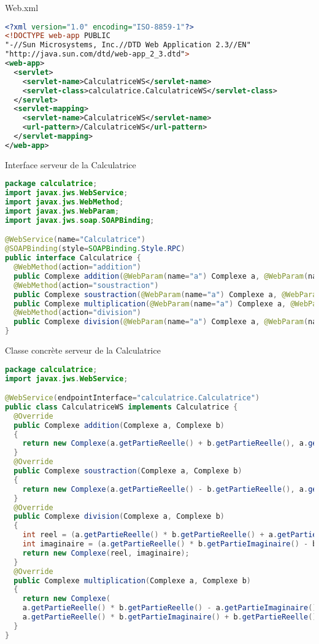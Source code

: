 \documentclass{article}
\begin{document}
Web.xml
\begin{lstlisting}[language=xml]
<?xml version="1.0" encoding="ISO-8859-1"?>
<!DOCTYPE web-app PUBLIC
"-//Sun Microsystems, Inc.//DTD Web Application 2.3//EN"
"http://java.sun.com/dtd/web-app_2_3.dtd">
<web-app>
  <servlet>
    <servlet-name>CalculatriceWS</servlet-name>
    <servlet-class>calculatrice.CalculatriceWS</servlet-class>
  </servlet>
  <servlet-mapping>
    <servlet-name>CalculatriceWS</servlet-name>
    <url-pattern>/CalculatriceWS</url-pattern>
  </servlet-mapping>
</web-app>
\end{lstlisting}

Interface serveur de la Calculatrice
\begin{lstlisting}[language=JAVA]
package calculatrice;
import javax.jws.WebService;
import javax.jws.WebMethod;
import javax.jws.WebParam;
import javax.jws.soap.SOAPBinding;

@WebService(name="Calculatrice")
@SOAPBinding(style=SOAPBinding.Style.RPC)
public interface Calculatrice {
  @WebMethod(action="addition")
  public Complexe addition(@WebParam(name="a") Complexe a, @WebParam(name="b") Complexe b);
  @WebMethod(action="soustraction")
  public Complexe soustraction(@WebParam(name="a") Complexe a, @WebParam(name="b") Complexe b);@WebMethod(action="multiplication")
  public Complexe multiplication(@WebParam(name="a") Complexe a, @WebParam(name="b") Complexe b);
  @WebMethod(action="division")
  public Complexe division(@WebParam(name="a") Complexe a, @WebParam(name="b") Complexe b);
}
\end{lstlisting}

Classe concrète serveur de la Calculatrice
\begin{lstlisting}[language=JAVA]
package calculatrice;
import javax.jws.WebService;

@WebService(endpointInterface="calculatrice.Calculatrice")
public class CalculatriceWS implements Calculatrice {
  @Override
  public Complexe addition(Complexe a, Complexe b)
  {
    return new Complexe(a.getPartieReelle() + b.getPartieReelle(), a.getPartieImaginaire() + b.getPartieImaginaire());
  }
  @Override
  public Complexe soustraction(Complexe a, Complexe b)
  {
    return new Complexe(a.getPartieReelle() - b.getPartieReelle(), a.getPartieImaginaire() - b.getPartieImaginaire());
  }
  @Override
  public Complexe division(Complexe a, Complexe b)
  {
    int reel = (a.getPartieReelle() * b.getPartieReelle() + a.getPartieImaginaire() * b.getPartieImaginaire()) / (b.getPartieReelle() * b.getPartieReelle() +
    int imaginaire = (a.getPartieReelle() * b.getPartieImaginaire() - b.getPartieReelle() * a.getPartieImaginaire()) / (b.getPartieReelle() * b.getPartieReel
    return new Complexe(reel, imaginaire);
  }
  @Override
  public Complexe multiplication(Complexe a, Complexe b)
  {
    return new Complexe(
    a.getPartieReelle() * b.getPartieReelle() - a.getPartieImaginaire() * b.getPartieImaginaire(),
    a.getPartieReelle() * b.getPartieImaginaire() + b.getPartieReelle() * a.getPartieImaginaire());
  }
}
\end{lstlisting}
\end{document}
